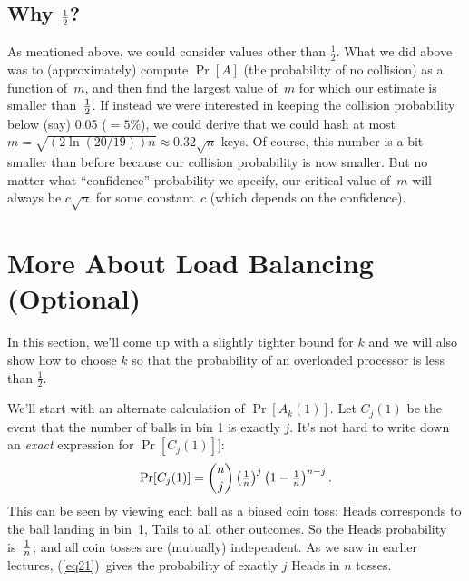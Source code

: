 \documentclass[11pt]{article}
\def\half{{\textstyle{1\over 2}}}
\begin{document}
\subsection*{Why $\half$?}
As mentioned above, we could consider values other than $\frac{1}{2}$.
What we did above was to (approximately) compute $\Pr[A]$ (the probability
of no collision) as a function of~$m$,
and then find the largest value of~$m$ for which our estimate is
smaller than~$\half$.  If instead we were interested in keeping the
collision probability below (say) 0.05 ($=5\%$), we could derive that
we could hash at most $m=\sqrt{(2\ln(20/19)) n}\approx 0.32\sqrt{n}$ keys. 
Of course, this number is a bit smaller than before because our collision probability
is now smaller.
But no matter what ``confidence'' probability we specify, our critical
value of~$m$ will always be $c\sqrt{n}$ for some constant~$c$ (which 
depends on the confidence).


\section*{More About Load Balancing (Optional)}
In this section, we'll come up with a slightly tighter bound for $k$ and we will also 
show how to choose $k$ so that the probability of an overloaded processor is less than $\frac{1}{2}$.

We'll start with an alternate calculation of $\Pr[A_k(1)]$. Let
$C_j(1)$ be the event that the number of balls in bin 1 is exactly $j$. It's not hard to write down 
an \emph{exact} expression for $\Pr[C_j(1)]]$:
\begin{equation}\label{eq21}
   \Pr[C_j(1)] = {n\choose j} \left({\textstyle{1\over n}}\right)^j
                             \left({\textstyle 1-{1\over n}}\right)^{n-j}.
\end{equation}              
This can be seen by viewing each ball as a biased coin toss: Heads
corresponds to the ball landing in bin~1, Tails to all other outcomes.
So the Heads probability is~$1\over n$; and all coin tosses are
(mutually) independent.  As we saw in earlier lectures, (\ref{eq21})~gives
the probability of exactly $j$ Heads in $n$ tosses.  
\end{document}
